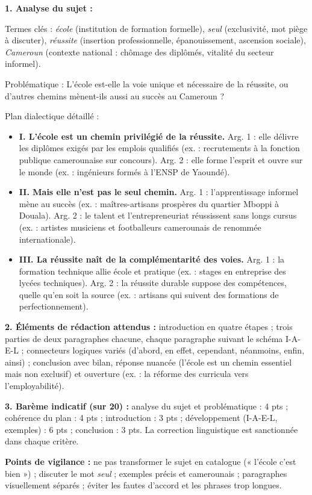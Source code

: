 \documentclass[11pt]{article}
\begin{document}
\begin{corrige}
\textbf{1. Analyse du sujet :}

Termes clés : \emph{école} (institution de formation formelle), \emph{seul} (exclusivité, mot piège à discuter), \emph{réussite} (insertion professionnelle, épanouissement, ascension sociale), \emph{Cameroun} (contexte national : chômage des diplômés, vitalité du secteur informel).

Problématique : L'école est-elle la voie unique et nécessaire de la réussite, ou d'autres chemins mènent-ils aussi au succès au Cameroun ?

Plan dialectique détaillé :
\begin{itemize}
\item \textbf{I. L'école est un chemin privilégié de la réussite.} Arg. 1 : elle délivre les diplômes exigés par les emplois qualifiés (ex. : recrutements à la fonction publique camerounaise sur concours). Arg. 2 : elle forme l'esprit et ouvre sur le monde (ex. : ingénieurs formés à l'ENSP de Yaoundé).
\item \textbf{II. Mais elle n'est pas le seul chemin.} Arg. 1 : l'apprentissage informel mène au succès (ex. : maîtres-artisans prospères du quartier Mboppi à Douala). Arg. 2 : le talent et l'entrepreneuriat réussissent sans longs cursus (ex. : artistes musiciens et footballeurs camerounais de renommée internationale).
\item \textbf{III. La réussite naît de la complémentarité des voies.} Arg. 1 : la formation technique allie école et pratique (ex. : stages en entreprise des lycées techniques). Arg. 2 : la réussite durable suppose des compétences, quelle qu'en soit la source (ex. : artisans qui suivent des formations de perfectionnement).
\end{itemize}

\textbf{2. Éléments de rédaction attendus :} introduction en quatre étapes ; trois parties de deux paragraphes chacune, chaque paragraphe suivant le schéma I-A-E-L ; connecteurs logiques variés (d'abord, en effet, cependant, néanmoins, enfin, ainsi) ; conclusion avec bilan, réponse nuancée (l'école est un chemin essentiel mais non exclusif) et ouverture (ex. : la réforme des curricula vers l'employabilité).

\textbf{3. Barème indicatif (sur 20) :} analyse du sujet et problématique : 4 pts ; cohérence du plan : 4 pts ; introduction : 3 pts ; développement (I-A-E-L, exemples) : 6 pts ; conclusion : 3 pts. La correction linguistique est sanctionnée dans chaque critère.

\textbf{Points de vigilance :} ne pas transformer le sujet en catalogue (« l'école c'est bien ») ; discuter le mot \emph{seul} ; exemples précis et camerounais ; paragraphes visuellement séparés ; éviter les fautes d'accord et les phrases trop longues.
\end{corrige}
\end{document}
